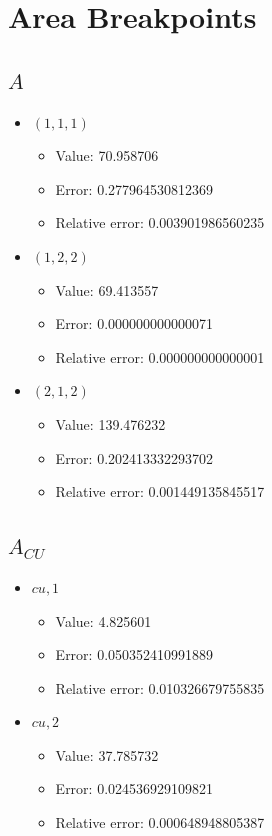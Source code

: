 \documentclass{article}%
\begin{document}
\section{Area Breakpoints}%
\thispagestyle{plain}%
\subsection{$A$}%
\begin{itemize}%
	\item $(1, 1, 1)$%
	\begin{itemize}%
		\item Value: 70.958706%
		\item Error: 0.277964530812369%
		\item Relative error: 0.003901986560235%
	\end{itemize}%
	\item $(1, 2, 2)$%
	\begin{itemize}%
		\item Value: 69.413557%
		\item Error: 0.000000000000071%
		\item Relative error: 0.000000000000001%
	\end{itemize}%
	\item $(2, 1, 2)$%
	\begin{itemize}%
		\item Value: 139.476232%
		\item Error: 0.202413332293702%
		\item Relative error: 0.001449135845517%
	\end{itemize}%
\end{itemize}%
\subsection{$A_{CU}$}%
\begin{itemize}%
	\item $\textit{cu},1$%
	\begin{itemize}%
		\item Value: 4.825601%
		\item Error: 0.050352410991889%
		\item Relative error: 0.010326679755835%
	\end{itemize}%
	\item $\textit{cu},2$%
	\begin{itemize}%
		\item Value: 37.785732%
		\item Error: 0.024536929109821%
		\item Relative error: 0.000648948805387%
	\end{itemize}%
\end{itemize}%
\end{document}
